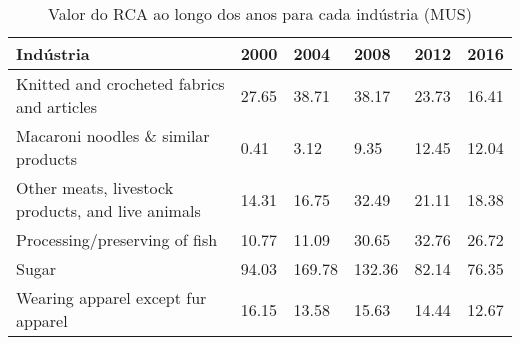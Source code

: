 \begin{table}
\centering
\caption{Valor do RCA ao longo dos anos para cada indústria (MUS)}
\label{tab:ex3-tempo-MUS}
\begin{tabular}{p{6cm}p{1.5cm}p{1.5cm}p{1.5cm}p{1.5cm}p{1.5cm}}
\toprule
                                        Indústria &  2000 &   2004 &   2008 &  2012 &  2016 \\
\midrule
       Knitted and crocheted fabrics and articles & 27.65 &  38.71 &  38.17 & 23.73 & 16.41 \\
              Macaroni noodles \& similar products &  0.41 &   3.12 &   9.35 & 12.45 & 12.04 \\
Other meats, livestock products, and live animals & 14.31 &  16.75 &  32.49 & 21.11 & 18.38 \\
                    Processing/preserving of fish & 10.77 &  11.09 &  30.65 & 32.76 & 26.72 \\
                                            Sugar & 94.03 & 169.78 & 132.36 & 82.14 & 76.35 \\
               Wearing apparel except fur apparel & 16.15 &  13.58 &  15.63 & 14.44 & 12.67 \\
\bottomrule
\end{tabular}
\end{table}
